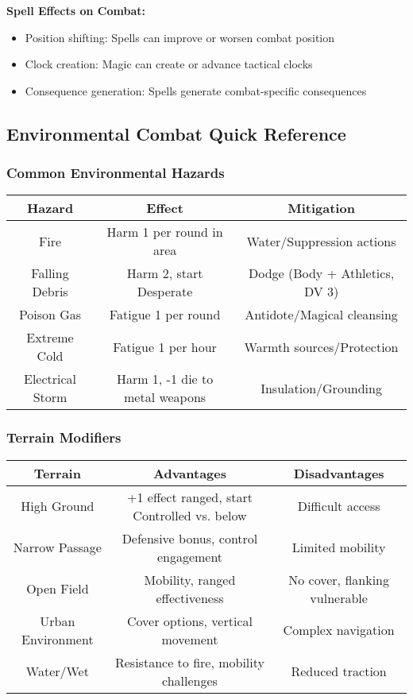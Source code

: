 \documentclass[11pt,letterpaper]{article}
\begin{document}
\textbf{Spell Effects on Combat:}
\begin{itemize}[leftmargin=*]
    \item Position shifting: Spells can improve or worsen combat position
    \item Clock creation: Magic can create or advance tactical clocks
    \item Consequence generation: Spells generate combat-specific consequences
\end{itemize}

\subsection{Environmental Combat Quick Reference}

\subsubsection{Common Environmental Hazards}

\begin{center}
\begin{tabular}{|c|c|c|}
\hline
\textbf{Hazard} & \textbf{Effect} & \textbf{Mitigation} \\
\hline
Fire & Harm 1 per round in area & Water/Suppression actions \\
\hline
Falling Debris & Harm 2, start Desperate & Dodge (Body + Athletics, DV 3) \\
\hline
Poison Gas & Fatigue 1 per round & Antidote/Magical cleansing \\
\hline
Extreme Cold & Fatigue 1 per hour & Warmth sources/Protection \\
\hline
Electrical Storm & Harm 1, -1 die to metal weapons & Insulation/Grounding \\
\hline
\end{tabular}
\end{center}

\subsubsection{Terrain Modifiers}

\begin{center}
\begin{tabular}{|c|c|c|}
\hline
\textbf{Terrain} & \textbf{Advantages} & \textbf{Disadvantages} \\
\hline
High Ground & +1 effect ranged, start Controlled vs. below & Difficult access \\
\hline
Narrow Passage & Defensive bonus, control engagement & Limited mobility \\
\hline
Open Field & Mobility, ranged effectiveness & No cover, flanking vulnerable \\
\hline
Urban Environment & Cover options, vertical movement & Complex navigation \\
\hline
Water/Wet & Resistance to fire, mobility challenges & Reduced traction \\
\hline
\end{tabular}
\end{center}
\end{document}
